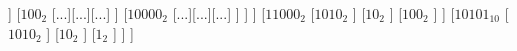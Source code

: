 \documentclass[12pt]{standalone}%
\begin{document}
	\begin{forest}
		[$100101110101_2$
			[$1100100_2$
				[$1010_2$]
				[$1100100_2$
					[$100_2$
						[...][...][...]
					]
					[$100_2$
						[...][...][...]
					]
					[$10000_2$
						[...][...][...]
					]
				]
			]
			[$11000_2$
					[$1010_2$
					]
					[$10_{2}$
					]
					[$100_{2}$
					]
			]
			[$10101_{10}$
				[$1010_2$
				]
				[$10_{2}$
				]
				[$1_{2}$
				]
			]
		]
	\end{forest}
\end{document}
